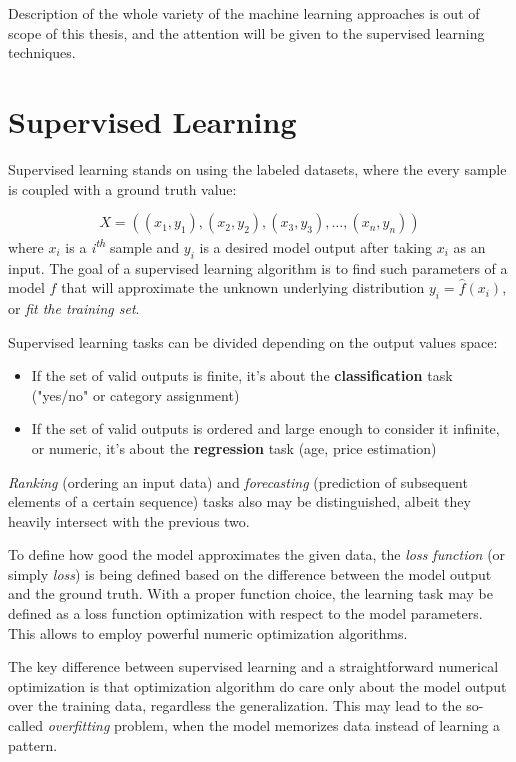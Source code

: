 \documentclass[thesis=B,english]{FITthesis}[2019/12/23]
\begin{document}
Description of the whole variety of the machine learning approaches is out of scope of this thesis, and the attention will be given to the supervised learning techniques.

\section{Supervised Learning}

Supervised learning stands on using the labeled datasets, where the every sample is coupled with a ground truth value:

\[ X = ((x_1, y_1), (x_2, y_2), (x_3, y_3), \dots,(x_n, y_n)) \]
where $x_i$ is a \textit{i\textsuperscript{th}} sample and $y_i$ is a desired model output after taking $x_i$ as an input. The goal of a supervised learning algorithm is to find such parameters of a model $f$  that will approximate the unknown underlying distribution $y_i = \hat{f}(x_i)$\cite{theoretical_ml}, or \textit{fit the training set}.

Supervised learning tasks can be divided depending on the output values space:
\begin{itemize}
	\item If the set of valid outputs is finite, it's about the \textbf{classification} task ("yes/no" or category assignment)
	\item If the set of valid outputs is ordered and large enough to consider it infinite, or numeric, it's about the \textbf{regression} task (age, price estimation)
\end{itemize}
\textit{Ranking} (ordering an input data) and \textit{forecasting} (prediction of subsequent elements of a certain sequence) tasks also may be distinguished, albeit they heavily intersect with the previous two.

To define how good the model approximates the given data, the \textit{loss function} (or simply \textit{loss}) is being defined based on the difference between the model output and the ground truth. With a proper function choice, the learning task may be defined as a loss function optimization with respect to the model parameters. This allows to employ powerful numeric optimization algorithms.

The key difference between supervised learning and a straightforward numerical optimization is that optimization algorithm do care only about the model output over the training data, regardless the generalization. This may lead to the so-called \textit{overfitting} problem, when the model memorizes data instead of learning a pattern.
\end{document}
